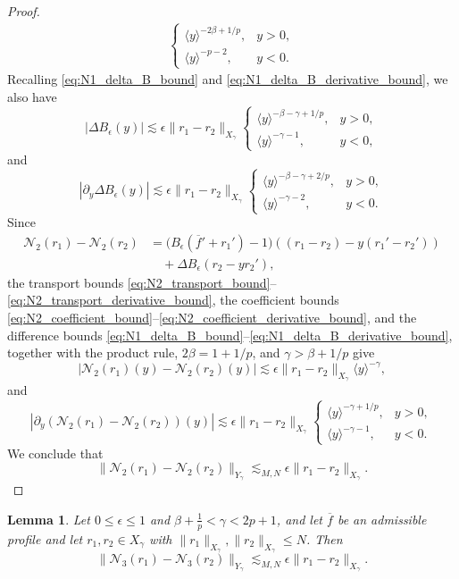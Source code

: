 \documentclass[11pt]{amsart}
\newtheorem{lemma}[theorem]{Lemma}
\theoremstyle{definition}
\theoremstyle{remark}
\numberwithin{equation}{section}
\newcommand{\mc}[1]{\mathcal{#1}}
\newcommand{\ov}[1]{\overline{#1}}
\newcommand{\ang}[1]{\langle #1 \rangle}
\begin{document}
\begin{proof}
\begin{equation}
\begin{aligned}
\begin{cases}
            \ang{y}^{-2\beta+1/p}, & y>0,\\
            \ang{y}^{-p-2}, & y<0.
        \end{cases}
    \end{aligned}
\end{equation}
    Recalling \eqref{eq:N1_delta_B_bound} and \eqref{eq:N1_delta_B_derivative_bound}, we also have
    \[
        |\Delta B_\epsilon(y)|
        \lesssim\epsilon\|r_1-r_2\|_{X_\gamma}
        \begin{cases}
            \ang{y}^{-\beta-\gamma+1/p}, & y>0,\\
            \ang{y}^{-\gamma-1}, & y<0,
        \end{cases}
    \]
    and
    \[
        |\partial_y\Delta B_\epsilon(y)|
        \lesssim\epsilon\|r_1-r_2\|_{X_\gamma}
        \begin{cases}
            \ang{y}^{-\beta-\gamma+2/p}, & y>0,\\
            \ang{y}^{-\gamma-2}, & y<0.
        \end{cases}
    \]
    Since
    \begin{align*}
        \mc{N}_2(r_1)-\mc{N}_2(r_2)
        &=\bigl(B_\epsilon(\ov{f}'+r_1')-1\bigr)
        \left((r_1-r_2)-y(r_1'-r_2')\right)\\
        &\quad+\Delta B_\epsilon\left(r_2-yr_2'\right),
    \end{align*}
    the transport bounds \eqref{eq:N2_transport_bound}--\eqref{eq:N2_transport_derivative_bound}, the coefficient bounds \eqref{eq:N2_coefficient_bound}--\eqref{eq:N2_coefficient_derivative_bound}, and the difference bounds \eqref{eq:N1_delta_B_bound}--\eqref{eq:N1_delta_B_derivative_bound}, together with the product rule, $2\beta=1+1/p$, and
    $\gamma>\beta+1/p$ give
    \[
        |\mc{N}_2(r_1)(y)-\mc{N}_2(r_2)(y)|
        \lesssim\epsilon\|r_1-r_2\|_{X_\gamma}\ang{y}^{-\gamma},
    \]
    and
    \[
        |\partial_y(\mc{N}_2(r_1)-\mc{N}_2(r_2))(y)|
        \lesssim\epsilon\|r_1-r_2\|_{X_\gamma}
        \begin{cases}
            \ang{y}^{-\gamma+1/p}, & y>0,\\
            \ang{y}^{-\gamma-1}, & y<0.
        \end{cases}
    \]
    We conclude that
    \[
        \|\mc{N}_2(r_1)-\mc{N}_2(r_2)\|_{Y_\gamma}
        \lesssim_{M,N}\epsilon\|r_1-r_2\|_{X_\gamma}.
    \]
\end{proof}

\begin{lemma}\label{lem:N3}
Let $0\le\epsilon\le1$ and $\beta + \frac{1}{p} < \gamma < 2p + 1$, and let $\ov{f}$ be an admissible profile and let $r_1, r_2 \in X_\gamma$ with $\|r_1\|_{X_\gamma}, \|r_2\|_{X_\gamma} \leq N$. Then 
\[\|\mc{N}_3(r_1) - \mc{N}_3(r_2)\|_{Y_\gamma} \lesssim_{M,N} \epsilon \|r_1 - r_2\|_{X_\gamma}.\]
\end{lemma}
\end{document}
